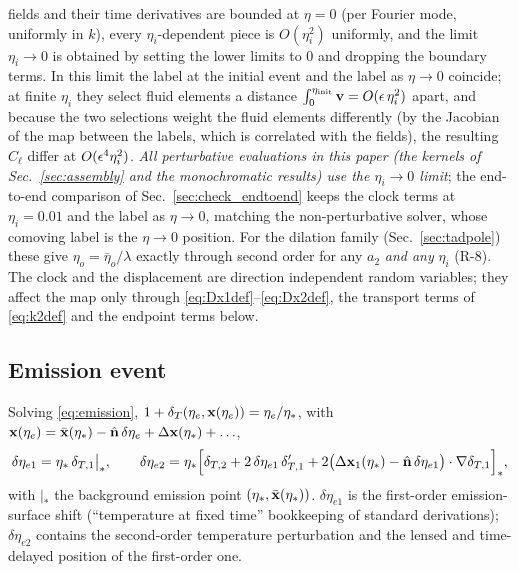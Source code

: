 fields and their time derivatives are bounded at $\eta=0$ (per Fourier mode, uniformly in $k$), every $\eta_i$-dependent piece is $O(\eta_i^2)$
uniformly, and the limit $\eta_i\to0$ is obtained by setting the lower limits to $0$ and dropping the boundary terms.  In this limit the
label at the initial event and the label as $\eta\to0$ coincide; at finite $\eta_i$ they select fluid elements a distance
$\int_0^{\eta_{\rm init}}\mathbf v=O(\epsilon\,\eta_i^2)$ apart, and because the two selections weight the fluid elements differently (by the Jacobian of
the map between the labels, which is correlated with the fields), the resulting $C_\ell$ differ at $O(\epsilon^4\eta_i^2)$.  \emph{All
perturbative evaluations in this paper (the kernels of Sec.~\ref{sec:assembly} and the monochromatic results) use the $\eta_i\to0$ limit};
the end-to-end comparison of Sec.~\ref{sec:check_endtoend} keeps the clock terms at $\eta_i=0.01$ and the label as $\eta\to0$, matching the
non-perturbative solver, whose comoving label is the $\eta\to0$ position.  For the dilation family (Sec.~\ref{sec:tadpole}) these give
$\eta_o=\bar\eta_o/\lambda$ exactly through second order for any $a_2$ \emph{and any} $\eta_i$ (R-8).
The clock and the displacement are direction independent random variables; they affect the map only through
\eqref{eq:Dx1def}--\eqref{eq:Dx2def}, the transport terms of \eqref{eq:k2def} and the endpoint terms below.

\subsection{Emission event}
\label{sec:emi}
Solving \eqref{eq:emission}, $1+\delta_T(\eta_e,\mathbf x(\eta_e))=\eta_e/\eta_*$, with $\mathbf x(\eta_e)=\bar{\mathbf x}(\eta_*)-\hat{\mathbf n}\,\delta\eta_e+\Delta\mathbf x(\eta_*)+\ldots$,
\begin{equation}
\delta\eta_{e1}=\eta_*\,\delta_{T,1}\big|_*,\qquad
\delta\eta_{e2}=\eta_*\Big[\delta_{T,2}+2\,\delta\eta_{e1}\,\delta_{T,1}'+2\big(\Delta\mathbf x_1(\eta_*)-\hat{\mathbf n}\,\delta\eta_{e1}\big)\cdot\nabla\delta_{T,1}\Big]_*,
\label{eq:deta_e}
\end{equation}
with $|_*$ the background emission point $(\eta_*,\bar{\mathbf x}(\eta_*))$.  $\delta\eta_{e1}$ is the first-order emission-surface shift
(``temperature at fixed time'' bookkeeping of standard derivations); $\delta\eta_{e2}$ contains the second-order temperature
perturbation and the lensed and time-delayed position of the first-order one.

